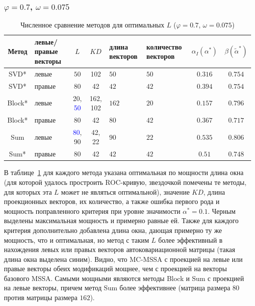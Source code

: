 \documentclass[specialist,
substylefile = spbu_report.rtx,
subf,href,colorlinks=true, 12pt]{disser}
\theoremstyle{definition}
\begin{document}
\subsubsection{$\varphi=0.7$, $\omega=0.075$}
\begin{table}[h]
	\caption{Численное сравнение методов для оптимальных $L$ ($\varphi=0.7$, $\omega=0.075$)}
	\label{tab:res_mc-ssa}
	\centering
	\begin{tabular}{|c>{\centering\arraybackslash}m{1in}cc>{\centering\arraybackslash}m{1in} >{\centering\arraybackslash}m{1in}cc|}\hline
		Метод & левые/правые векторы & $L$ & $KD$ & длина векторов & количество векторов & $\alpha_I(\alpha^*)$ & $\beta(\widetilde\alpha^*)$ \\
		\hline
		SVD* & левые & $50$ &102& $50$ & $50$ & $0.316$ & $0.754$\\
		\hline
		SVD* & правые & $80$ &42& $42$ & $42$ & $0.394$ & $0.754$\\
		\hline
		Block* & левые & 20, \textcolor{blue}{50} & 162, 102 & $162$ & $20$ & $0.157$ & $\mathbf{0.796}$ \\
		\hline
		Block* & правые & $80$ &42& $80$ & $42$ & $0.367$ & $0.717$\\
		\hline
		Sum & левые & \textcolor{blue}{80}, 90 &42, 22& $90$ & $22$ & $0.535$ & $\mathbf{0.806}$ \\
		\hline
		Sum* & правые & $80$ &42& $42$ & $42$ & $0.51$ & $0.748$ \\
		\hline
	\end{tabular}
\end{table}
В таблице~\ref{tab:res_mc-ssa} для каждого метода указана оптимальная по мощности длина окна (для которой удалось простроить ROC-кривую, звездочкой помечены те методы, для которых эта $L$ может не являться оптимальной), значение $KD$, длина проекционных векторов, их количество, а также ошибка первого рода и мощность поправленного критерия при уровне значимости $\alpha^*=0.1$. Черным выделены максимальная мощность и примерно равные ей. Также для каждого критерия дополнительно добавлена длина окна, дающая примерно ту же мощность, что и оптимальная, но метод с таким $L$ более эффективный в нахождения левых или правых векторов автоковариационной матрицы (такая длина окна выделена синим). Видно, что MC-MSSA с проекцией на левые или правые векторы обеих модификаций мощнее, чем с проекцией на векторы базового MSSA. Самыми мощными являются методы Block и Sum с проекцией на левые векторы, причем метод Sum более эффективнее (матрица размера $80$ против матрицы размера $162$).
\end{document}
